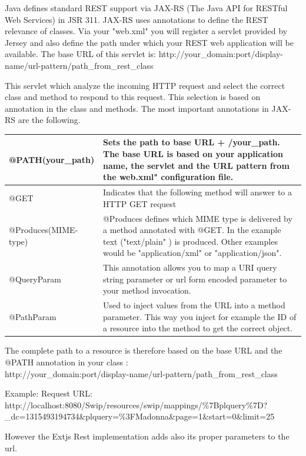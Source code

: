 \par Java defines standard REST support via JAX-RS (The Java API for RESTful Web Services) in JSR 311. JAX-RS uses annotations to define the REST relevance of classes. Via your "web.xml" you will register a servlet provided by Jersey and also define the path under which your REST web application will be available. The base URL of this servlet is:                       
http://your\_domain:port/display-name/url-pattern/path\_from\_rest\_class
\par This servlet which analyze the incoming HTTP request and select the correct class and method to respond to this request. This selection is based on annotation in the class and methods. The most important annotations in JAX-RS are the following. \\                                
\begin{center}
       \begin{tabular}{ | p{4cm} | p{8cm} |}
                \hline
		@PATH(your\_path) & Sets the path to base URL + /your\_path. The base URL is based on your application name, the servlet and the URL pattern from the web.xml" configuration file. \\ \hline
		@GET &	Indicates that the following method will answer to a HTTP GET request \\ \hline
		@Produces(MIME-type) & @Produces defines which MIME type is delivered by a method annotated with @GET. In the example text ("text/plain" ) is produced. Other examples would be "application/xml" or "application/json". \\ \hline
		@QueryParam  & This annotation allows you to map a URI query string parameter or url form encoded parameter to your method invocation. \\ \hline
		@PathParam & Used to inject values from the URL into a method parameter. This way you inject for example the ID of a resource into the method to get the correct object. \\ \hline
		
	\end{tabular}
	\label{tab:}
\end{center}

\par The complete path to a resource is therefore based on the base URL and the @PATH annotation in your class :\\ 
http://your\_domain:port/display-name/url-pattern/path\_from\_rest\_class
\par Example:
Request URL:\\
http://localhost:8080/Swip/resources/swip/mappings/\%7Bplquery\%7D?\_dc=1315493194734\&plquery=\%3FMadonna\&page=1\&start=0\&limit=25                      
\par However the Extjs Rest implementation adds also its proper parameters to the url.
\\

